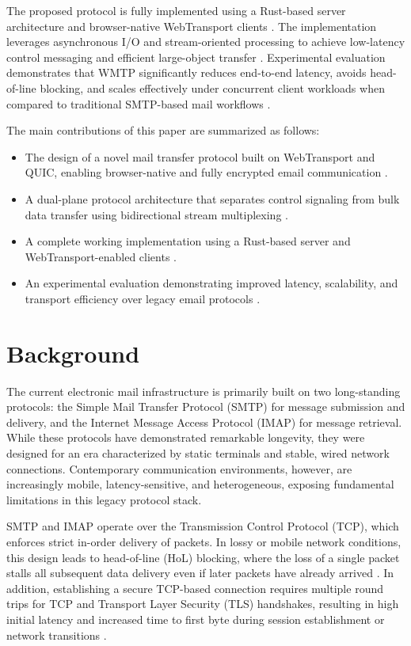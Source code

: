 \documentclass[10pt,a4paper]{article}
\begin{document}
The proposed protocol is fully implemented using a Rust-based server architecture and browser-native WebTransport clients \cite{klabnik2019,rustasync,webtransport}. The implementation leverages asynchronous I/O and stream-oriented processing to achieve low-latency control messaging and efficient large-object transfer \cite{rustasync}. Experimental evaluation demonstrates that WMTP significantly reduces end-to-end latency, avoids head-of-line blocking, and scales effectively under concurrent client workloads when compared to traditional SMTP-based mail workflows \cite{smtp,imap,base64,quic}.

The main contributions of this paper are summarized as follows:
\begin{itemize}
  \item The design of a novel mail transfer protocol built on WebTransport and QUIC, enabling browser-native and fully encrypted email communication \cite{quic,webtransport}.
  \item A dual-plane protocol architecture that separates control signaling from bulk data transfer using bidirectional stream multiplexing \cite{quic}.
  \item A complete working implementation using a Rust-based server and WebTransport-enabled clients \cite{klabnik2019,rustasync,webtransport}.
  \item An experimental evaluation demonstrating improved latency, scalability, and transport efficiency over legacy email protocols \cite{smtp,imap,base64}.
\end{itemize}

\vspace{12pt}
\section{Background}

The current electronic mail infrastructure is primarily built on two long-standing protocols: the Simple Mail Transfer Protocol (SMTP) \cite{smtp} for message submission and delivery, and the Internet Message Access Protocol (IMAP) \cite{imap} for message retrieval. While these protocols have demonstrated remarkable longevity, they were designed for an era characterized by static terminals and stable, wired network connections. Contemporary communication environments, however, are increasingly mobile, latency-sensitive, and heterogeneous, exposing fundamental limitations in this legacy protocol stack.

SMTP and IMAP operate over the Transmission Control Protocol (TCP), which enforces strict in-order delivery of packets. In lossy or mobile network conditions, this design leads to head-of-line (HoL) blocking, where the loss of a single packet stalls all subsequent data delivery even if later packets have already arrived \cite{quic}. In addition, establishing a secure TCP-based connection requires multiple round trips for TCP and Transport Layer Security (TLS) handshakes, resulting in high initial latency and increased time to first byte during session establishment or network transitions \cite{quic}.
\end{document}
